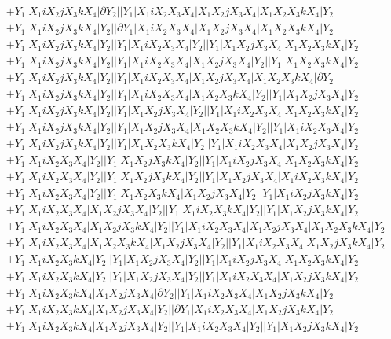 \documentclass{article}[12pt]
\begin{document}
\begin{align*} 
 & +Y_1|X_1iX_2jX_3kX_4|\partial Y_2||Y_1|X_1iX_2X_3X_4|X_1X_2jX_3X_4|X_1X_2X_3kX_4|Y_2\\ 
 & +Y_1|X_1iX_2jX_3kX_4|Y_2||\partial Y_1|X_1iX_2X_3X_4|X_1X_2jX_3X_4|X_1X_2X_3kX_4|Y_2\\ 
 & +Y_1|X_1iX_2jX_3kX_4|Y_2||Y_1|X_1iX_2X_3X_4|Y_2||Y_1|X_1X_2jX_3X_4|X_1X_2X_3kX_4|Y_2\\ 
 & +Y_1|X_1iX_2jX_3kX_4|Y_2||Y_1|X_1iX_2X_3X_4|X_1X_2jX_3X_4|Y_2||Y_1|X_1X_2X_3kX_4|Y_2\\ 
 & +Y_1|X_1iX_2jX_3kX_4|Y_2||Y_1|X_1iX_2X_3X_4|X_1X_2jX_3X_4|X_1X_2X_3kX_4|\partial Y_2\\ 
 & +Y_1|X_1iX_2jX_3kX_4|Y_2||Y_1|X_1iX_2X_3X_4|X_1X_2X_3kX_4|Y_2||Y_1|X_1X_2jX_3X_4|Y_2\\ 
 & +Y_1|X_1iX_2jX_3kX_4|Y_2||Y_1|X_1X_2jX_3X_4|Y_2||Y_1|X_1iX_2X_3X_4|X_1X_2X_3kX_4|Y_2\\ 
 & +Y_1|X_1iX_2jX_3kX_4|Y_2||Y_1|X_1X_2jX_3X_4|X_1X_2X_3kX_4|Y_2||Y_1|X_1iX_2X_3X_4|Y_2\\ 
 & +Y_1|X_1iX_2jX_3kX_4|Y_2||Y_1|X_1X_2X_3kX_4|Y_2||Y_1|X_1iX_2X_3X_4|X_1X_2jX_3X_4|Y_2\\ 
 & +Y_1|X_1iX_2X_3X_4|Y_2||Y_1|X_1X_2jX_3kX_4|Y_2||Y_1|X_1iX_2jX_3X_4|X_1X_2X_3kX_4|Y_2\\ 
 & +Y_1|X_1iX_2X_3X_4|Y_2||Y_1|X_1X_2jX_3kX_4|Y_2||Y_1|X_1X_2jX_3X_4|X_1iX_2X_3kX_4|Y_2\\ 
 & +Y_1|X_1iX_2X_3X_4|Y_2||Y_1|X_1X_2X_3kX_4|X_1X_2jX_3X_4|Y_2||Y_1|X_1iX_2jX_3kX_4|Y_2\\ 
 & +Y_1|X_1iX_2X_3X_4|X_1X_2jX_3X_4|Y_2||Y_1|X_1iX_2X_3kX_4|Y_2||Y_1|X_1X_2jX_3kX_4|Y_2\\ 
 & +Y_1|X_1iX_2X_3X_4|X_1X_2jX_3kX_4|Y_2||Y_1|X_1iX_2X_3X_4|X_1X_2jX_3X_4|X_1X_2X_3kX_4|Y_2\\
 & +Y_1|X_1iX_2X_3X_4|X_1X_2X_3kX_4|X_1X_2jX_3X_4|Y_2||Y_1|X_1iX_2X_3X_4|X_1X_2jX_3kX_4|Y_2\\ 
 & +Y_1|X_1iX_2X_3kX_4|Y_2||Y_1|X_1X_2jX_3X_4|Y_2||Y_1|X_1iX_2jX_3X_4|X_1X_2X_3kX_4|Y_2\\ 
 & +Y_1|X_1iX_2X_3kX_4|Y_2||Y_1|X_1X_2jX_3X_4|Y_2||Y_1|X_1iX_2X_3X_4|X_1X_2jX_3kX_4|Y_2\\ 
 & +Y_1|X_1iX_2X_3kX_4|X_1X_2jX_3X_4|\partial Y_2||Y_1|X_1iX_2X_3X_4|X_1X_2jX_3kX_4|Y_2\\ 
 & +Y_1|X_1iX_2X_3kX_4|X_1X_2jX_3X_4|Y_2||\partial Y_1|X_1iX_2X_3X_4|X_1X_2jX_3kX_4|Y_2\\ 
 & +Y_1|X_1iX_2X_3kX_4|X_1X_2jX_3X_4|Y_2||Y_1|X_1iX_2X_3X_4|Y_2||Y_1|X_1X_2jX_3kX_4|Y_2\\ 

\end{align*}
\end{document}
